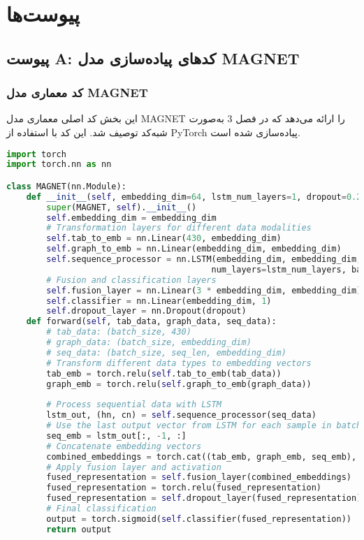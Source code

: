 \chapter*{پیوست‌ها}\label{peyvast}

\section{پیوست A: کدهای پیاده‌سازی مدل MAGNET}

\subsection{کد معماری مدل MAGNET}
این بخش کد اصلی معماری مدل MAGNET را ارائه می‌دهد که در فصل 3 به‌صورت شبه‌کد توصیف شد. این کد با استفاده از PyTorch پیاده‌سازی شده است.

\begin{LTR}
\begin{lstlisting}[language=Python, caption={کد معماری مدل MAGNET}, label={lst:magnet_architecture}, basicstyle=\scriptsize\ttfamily]
import torch
import torch.nn as nn

class MAGNET(nn.Module):
    def __init__(self, embedding_dim=64, lstm_num_layers=1, dropout=0.2):
        super(MAGNET, self).__init__()        
        self.embedding_dim = embedding_dim
        # Transformation layers for different data modalities
        self.tab_to_emb = nn.Linear(430, embedding_dim)
        self.graph_to_emb = nn.Linear(embedding_dim, embedding_dim)
        self.sequence_processor = nn.LSTM(embedding_dim, embedding_dim, 
                                         num_layers=lstm_num_layers, batch_first=True)
        # Fusion and classification layers
        self.fusion_layer = nn.Linear(3 * embedding_dim, embedding_dim)
        self.classifier = nn.Linear(embedding_dim, 1)
        self.dropout_layer = nn.Dropout(dropout)
    def forward(self, tab_data, graph_data, seq_data):
        # tab_data: (batch_size, 430)
        # graph_data: (batch_size, embedding_dim)
        # seq_data: (batch_size, seq_len, embedding_dim)
        # Transform different data types to embedding vectors
        tab_emb = torch.relu(self.tab_to_emb(tab_data))
        graph_emb = torch.relu(self.graph_to_emb(graph_data))
        
        # Process sequential data with LSTM
        lstm_out, (hn, cn) = self.sequence_processor(seq_data)
        # Use the last output vector from LSTM for each sample in batch
        seq_emb = lstm_out[:, -1, :]
        # Concatenate embedding vectors
        combined_embeddings = torch.cat((tab_emb, graph_emb, seq_emb), dim=-1)
        # Apply fusion layer and activation
        fused_representation = self.fusion_layer(combined_embeddings)
        fused_representation = torch.relu(fused_representation)
        fused_representation = self.dropout_layer(fused_representation)
        # Final classification
        output = torch.sigmoid(self.classifier(fused_representation))
        return output
\end{lstlisting}
\end{LTR}


